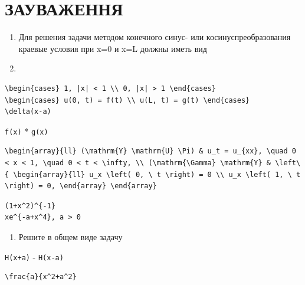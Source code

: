 \documentclass[
  ukrainian,
]{article}
\providecommand{\tightlist}{%
  \setlength{\itemsep}{0pt}\setlength{\parskip}{0pt}}
\begin{document}
\section{ЗАУВАЖЕННЯ}\label{ux437ux430ux443ux432ux430ux436ux435ux43dux43dux44f-1}

\begin{enumerate}
\def\labelenumi{\arabic{enumi}.}
\item
  Для решения задачи методом конечного синус- или косинуспреобразования
  краевые условия при x=0 и x=L должны иметь вид
\item
\end{enumerate}

\begin{verbatim}
\begin{cases} 1, |x| < 1 \\ 0, |x| > 1 \end{cases}
\begin{cases} u(0, t) = f(t) \\ u(L, t) = g(t) \end{cases}
\delta(x-a)
\end{verbatim}

\texttt{f(x)} * \texttt{g(x)}

\begin{verbatim}
\begin{array}{ll} (\mathrm{Y} \mathrm{U} \Pi) & u_t = u_{xx}, \quad 0 < x < 1, \quad 0 < t < \infty, \\ (\mathrm{\Gamma} \mathrm{Y} & \left\{ \begin{array}{ll} u_x \left( 0, \ t \right) = 0 \\ u_x \left( 1, \ t \right) = 0, \end{array} \end{array}
\end{verbatim}

\begin{verbatim}
(1+x^2)^{-1}
xe^{-a+x^4}, a > 0
\end{verbatim}

\begin{enumerate}
\def\labelenumi{\arabic{enumi}.}
\setcounter{enumi}{1}
\tightlist
\item
  Решите в общем виде задачу
\end{enumerate}

\texttt{H(x+a)} - \texttt{H(x-a)}

\begin{verbatim}
\frac{a}{x^2+a^2}
\end{verbatim}
\end{document}
